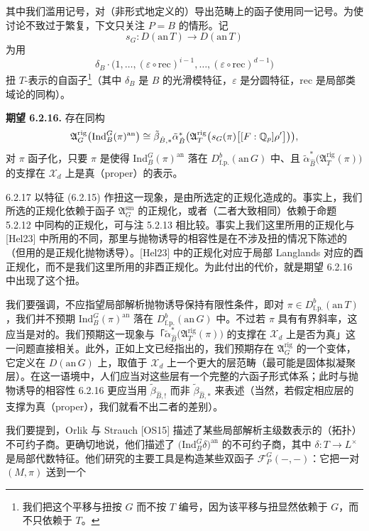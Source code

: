其中我们滥用记号，对（非形式地定义的）导出范畴上的函子使用同一记号。为使讨论不致过于繁复，下文只关注 $P=B$ 的情形。记
\[
s_G:D(\mathrm{an}\,T)\longrightarrow D(\mathrm{an}\,T)
\]
为用
\begin{equation}\tag{6.2.15}\label{eq:a4-6-2-15}
\delta_B\cdot\bigl(1,\dots,(\varepsilon\circ\mathrm{rec})^{i-1},\dots,
(\varepsilon\circ\mathrm{rec})^{d-1}\bigr)
\end{equation}
扭 $T$-表示的自函子\footnote{我们把这个平移与扭按 $G$ 而不按 $T$ 编号，因为该平移与扭显然依赖于 $G$，而不只依赖于 $T$。}（其中 $\delta_B$ 是 $B$ 的光滑模特征，$\varepsilon$ 是分圆特征，$\mathrm{rec}$ 是局部类域论的同构）。

\medskip\noindent\textbf{期望 6.2.16.}\label{exp:a4-6-2-16} 存在同构
\[
\mathfrak A^{\mathrm{rig}}_G\bigl(\mathrm{Ind}^G_B(\pi)^{\mathrm{an}}\bigr)
\cong\tilde\beta_{\hat B,*}\tilde\alpha^*_{\hat B}
\bigl(\mathfrak A^{\mathrm{rig}}_T\bigl(s_G(\pi)\bigl[[F:\mathbb{Q}_p]\rho'\bigr]\bigr)\bigr),
\]
对 $\pi$ 函子化，只要 $\pi$ 是使得 $\mathrm{Ind}^G_B(\pi)^{\mathrm{an}}$ 落在 $D^b_{\mathrm{f.p.}}(\mathrm{an}\,G)$ 中、且 $\tilde\alpha^*_{\hat B}\bigl(\mathfrak A^{\mathrm{rig}}_T(\pi)\bigr)$ 的支撑在 $\mathcal X_d$ 上是真（proper）的表示。

\begin{rem}{6.2.17}
以特征 (6.2.15) 作扭这一现象，是由所选定的正规化造成的。事实上，我们所选的正规化依赖于函子 $\mathfrak A^{\mathrm{sm}}_G$ 的正规化，或者（二者大致相同）依赖于命题 5.2.12 中同构的正规化，可与注 5.2.13 相比较。事实上我们这里所用的正规化与 [Hel23] 中所用的不同，那里与抛物诱导的相容性是在不涉及扭的情况下陈述的（但用的是正规化抛物诱导）。[Hel23] 中的正规化对应于局部 Langlands 对应的酉正规化，而不是我们这里所用的非酉正规化。为此付出的代价，就是期望 6.2.16 中出现了这个扭。
\end{rem}

我们要强调，不应指望局部解析抛物诱导保持有限性条件，即对 $\pi\in D^b_{\mathrm{f.p.}}(\mathrm{an}\,T)$，我们并不预期 $\mathrm{Ind}^G_B(\pi)^{\mathrm{an}}$ 落在 $D^b_{\mathrm{f.p.}}(\mathrm{an}\,G)$ 中。不过若 $\pi$ 具有有界斜率，这应当是对的。我们预期这一现象与「$\tilde\alpha^*_{\hat B}\bigl(\mathfrak A^{\mathrm{rig}}_T(\pi)\bigr)$ 的支撑在 $\mathcal X_d$ 上是否为真」这一问题直接相关。此外，正如上文已经指出的，我们预期存在 $\mathfrak A^{\mathrm{rig}}_G$ 的一个变体，它定义在 $D(\mathrm{an}\,G)$ 上，取值于 $\mathcal X_d$ 上一个更大的层范畴（最可能是固体拟凝聚层）。在这一语境中，人们应当对这些层有一个完整的六函子形式体系；此时与抛物诱导的相容性 6.2.16 更应当用 $\tilde\beta_{\hat B,!}$ 而非 $\tilde\beta_{\hat B,*}$ 来表述（当然，若假定相应层的支撑为真（proper），我们就看不出二者的差别）。

我们要提到，Orlik 与 Strauch [OS15] 描述了某些局部解析主级数表示的（拓扑）不可约子商。更确切地说，他们描述了 $\bigl(\mathrm{Ind}^G_B\delta\bigr)^{\mathrm{an}}$ 的不可约子商，其中 $\delta:T\to L^\times$ 是局部代数特征。他们研究的主要工具是构造某些双函子 $\mathcal F^G_P(-,-)$：它把一对 $(M,\pi)$ 送到一个

